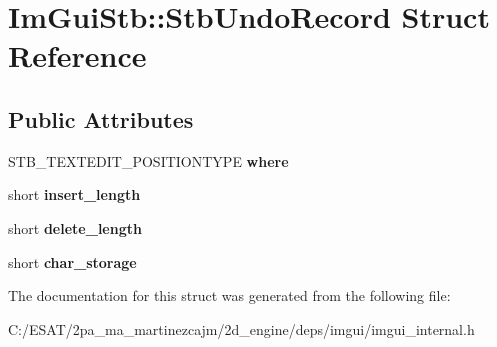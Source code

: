 \hypertarget{struct_im_gui_stb_1_1_stb_undo_record}{}\section{Im\+Gui\+Stb\+:\+:Stb\+Undo\+Record Struct Reference}
\label{struct_im_gui_stb_1_1_stb_undo_record}
\subsection*{Public Attributes}
\begin{DoxyCompactItemize}
\item 
\mbox{\label{struct_im_gui_stb_1_1_stb_undo_record_acd3cbeaa50d642520c1a317c7d89a47b}} 
S\+T\+B\+\_\+\+T\+E\+X\+T\+E\+D\+I\+T\+\_\+\+P\+O\+S\+I\+T\+I\+O\+N\+T\+Y\+PE {\bfseries where}
\item 
\mbox{\label{struct_im_gui_stb_1_1_stb_undo_record_a588a05bfd8e4702d6af78d21141d3b89}} 
short {\bfseries insert\+\_\+length}
\item 
\mbox{\label{struct_im_gui_stb_1_1_stb_undo_record_aca8b20387e3b7d890a21638109574279}} 
short {\bfseries delete\+\_\+length}
\item 
\mbox{\label{struct_im_gui_stb_1_1_stb_undo_record_a5641d98f1c3611383d07cca2c5596a8e}} 
short {\bfseries char\+\_\+storage}
\end{DoxyCompactItemize}


The documentation for this struct was generated from the following file\+:\begin{DoxyCompactItemize}
\item 
C\+:/\+E\+S\+A\+T/2pa\+\_\+ma\+\_\+martinezcajm/2d\+\_\+engine/deps/imgui/imgui\+\_\+internal.\+h\end{DoxyCompactItemize}
